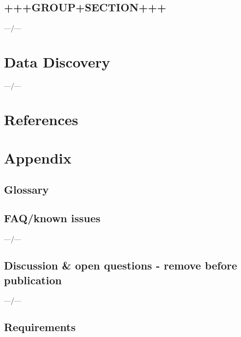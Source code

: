 \documentclass[a4paper,10pt,bibtotoc]{scrartcl}
\begin{document}
\newpage

\subsection{+++GROUP+SECTION+++}
---/---


\newpage
\section{Data Discovery}

---/---

\newpage
\section{References}





\newpage
\appendix
\section{Appendix}

\subsection{Glossary}
\label{sec:glossary}



\subsection{FAQ/known issues}

---/---

\subsection{Discussion \& open questions - remove before publication}
---/---

\subsection{Requirements}
\end{document}
